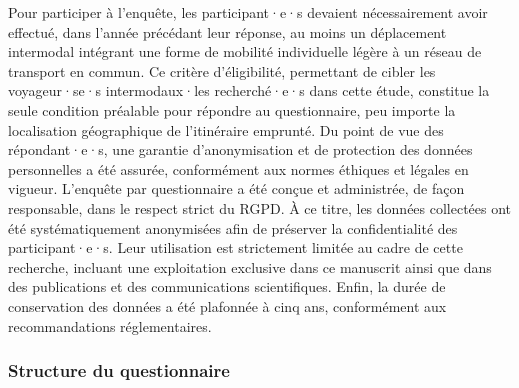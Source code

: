 \begin{refsegment}
Pour participer à l'enquête, les participant·e·s devaient nécessairement avoir effectué, dans l'année précédant leur réponse, au moins un déplacement intermodal intégrant une forme de mobilité individuelle légère à un réseau de transport en commun. Ce critère d'éligibilité, permettant de cibler les voyageur·se·s intermodaux·les recherché·e·s dans cette étude, constitue la seule condition préalable pour répondre au questionnaire, peu importe la localisation géographique de l'itinéraire emprunté. Du point de vue des répondant·e·s, une garantie d’anonymisation et de protection des données personnelles a été assurée, conformément aux normes éthiques et légales en vigueur. L’enquête par questionnaire a été conçue et administrée, de façon responsable, dans le respect strict du \acrfull{RGPD}. À ce titre, les données collectées ont été systématiquement anonymisées afin de préserver la confidentialité des participant·e·s. Leur utilisation est strictement limitée au cadre de cette recherche, incluant une exploitation exclusive dans ce manuscrit ainsi que dans des publications et des communications scientifiques. Enfin, la durée de conservation des données a été plafonnée à cinq ans, conformément aux recommandations réglementaires.%

\subsubsection*{Structure du questionnaire
    \label{chap3:administration-questionnaire-usagers-structure}
    }


\end{refsegment}

